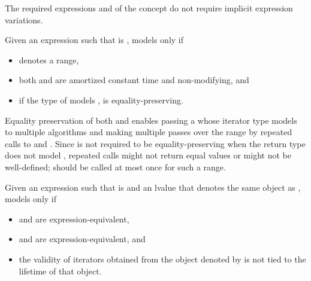 \begin{itemdescr}
\pnum
The required expressions
and
of the  concept
do not require implicit expression variations.

\pnum
Given an expression  such that  is ,
 models  only if
\begin{itemize}
\item {}
  denotes a range,

\item both
and
are amortized constant time and non-modifying, and

\item if the type of  models
,  is equality-preserving.
\end{itemize}

\pnum
\begin{note}
Equality preservation of both  and
 enables passing a  whose iterator
type models  to multiple
algorithms and making multiple passes over the range by repeated calls to
 and .
Since  is not required to be equality-preserving
when the return type does not model , repeated calls
might not return equal values or might not be well-defined;
 should be called at most once for such a range.
\end{note}

\pnum
Given an expression  such that  is 
and an lvalue  that denotes the same object as ,
 models  only if
\begin{itemize}
\item {} and 
  are expression-equivalent,
\item {} and 
  are expression-equivalent, and
\item the validity of iterators obtained from the object denoted
  by  is not tied to the lifetime of that object.
\end{itemize}


\end{itemdescr}
